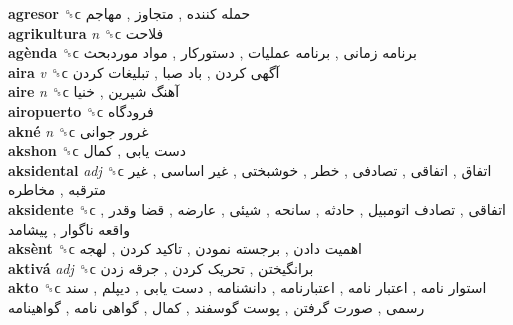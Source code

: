 \textbf{agresor} ␝ϲ   حمله کننده ,  متجاوز ,  مهاجم   \\
\textbf{agrikultura} \emph{n}  ␝ϲ   فلاحت   \\
\textbf{agènda} ␝ϲ   برنامه زمانی ,  برنامه عملیات ,  دستورکار ,  مواد موردبحث   \\
\textbf{aira} \emph{v}  ␝ϲ   آگهی کردن ,  باد صبا ,  تبلیغات کردن   \\
\textbf{aire} \emph{n}  ␝ϲ   آهنگ شیرین ,  خنیا   \\
\textbf{airopuerto} ␝ϲ   فرودگاه   \\
\textbf{akné} \emph{n}  ␝ϲ   غرور جوانی   \\
\textbf{akshon} ␝ϲ   دست یابی ,  کمال   \\
\textbf{aksidental} \emph{adj}  ␝ϲ   اتفاق ,  اتفاقی ,  تصادفی ,  خطر ,  خوشبختی ,  غیر اساسی ,  غیر مترقبه ,  مخاطره   \\
\textbf{aksidente} ␝ϲ   اتفاقی ,  تصادف اتومبیل ,  حادثه ,  سانحه ,  شیئی ,  عارضه ,  قضا وقدر ,  واقعه ناگوار ,  پیشامد   \\
\textbf{aksènt} ␝ϲ   اهمیت دادن ,  برجسته نمودن ,  تاکید کردن ,  لهجه   \\
\textbf{aktivá} \emph{adj}  ␝ϲ   برانگیختن ,  تحریک کردن ,  جرقه زدن   \\
\textbf{akto} ␝ϲ   استوار نامه ,  اعتبار نامه ,  اعتبارنامه ,  دانشنامه ,  دست یابی ,  دیپلم ,  سند رسمی ,  صورت گرفتن ,  پوست گوسفند ,  کمال ,  گواهی نامه ,  گواهینامه   \\
